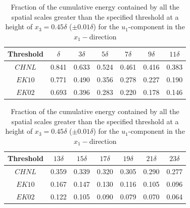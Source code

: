 \begin{table}
	\caption{Fraction of the cumulative energy contained by all the spatial scales greater than the specified threshold at a height of $x_3=0.45\delta$ ($\pm 0.01\delta$) for the $u_1$-component in the $x_1-$direction}
	\centering
	\begin{tabular}{c c c c c c c}
		\hline
		Threshold & $\delta$ & $3\delta$ & $5\delta$ & $7\delta$ & $9\delta$ & $11\delta$ \\
		\hline 
		$CHNL$ 	   & 0.841    & 0.633     & 0.524     & 0.461     & 0.416     & 0.383 \\ 
		$EK10$     & 0.771    & 0.490     & 0.356     & 0.278     & 0.227     & 0.190 \\ 
		$EK02$     & 0.693    & 0.396     & 0.283     & 0.220     & 0.178     & 0.146 \\
	\end{tabular}
	
	\begin{tabular}{c c c c c c c}
		\hline
		Threshold & $13\delta$ & $15\delta$ & $17\delta$ & $19\delta$ & $21\delta$ & $23\delta$  \\
		\hline 
		$CHNL$    & 0.359      & 0.339      & 0.320      & 0.305      & 0.290      & 0.277 \\
		$EK10$    & 0.167      & 0.147      & 0.130      & 0.116      & 0.105      & 0.096  \\
		$EK02$    & 0.122      & 0.105      & 0.090      & 0.079      & 0.070      & 0.064  \\
		\hline 
		\hline 
	\end{tabular}
	\label{tab:prcnt_cum_energy}
\end{table}

